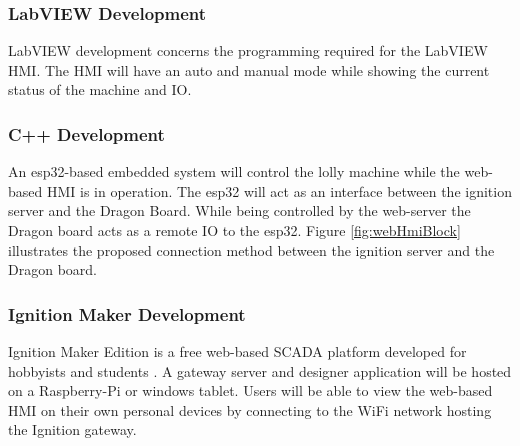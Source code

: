     \subsubsection{LabVIEW Development}
         LabVIEW development concerns the programming required for the LabVIEW HMI. The HMI will have an auto and manual mode while showing the current status of the machine and IO.
    \subsubsection{C++ Development}
        An esp32-based embedded system will control the lolly machine while the web-based HMI is in operation. The esp32 will act as an interface between the ignition server and the Dragon Board. While being controlled by the web-server the Dragon board acts as a remote IO to the esp32. Figure \ref{fig:webHmiBlock} illustrates the proposed connection method between the ignition server and the Dragon board.
    \subsubsection{Ignition Maker Development}
        Ignition Maker Edition is a free web-based SCADA platform developed for hobbyists and students \cite{ignitionMaker}. A gateway server and designer application will be hosted on a Raspberry-Pi or windows tablet. Users will be able to view the web-based HMI on their own personal devices by connecting to the WiFi network hosting the Ignition gateway.


